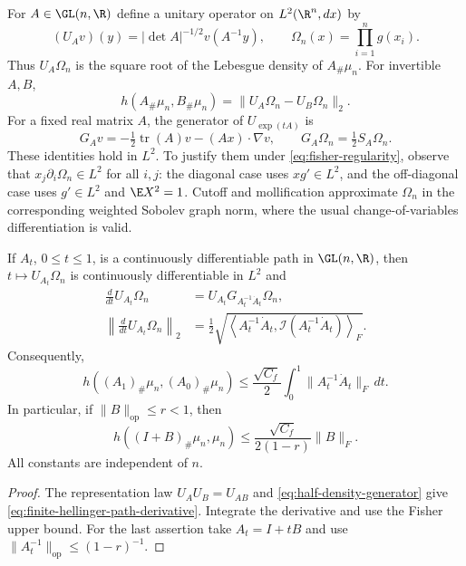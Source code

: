 For $A\in\GL(n,\R)$ define a unitary operator on
$L^2(\R^n,dx)$ by
\[
 (U_Av)(y)=|\det A|^{-1/2}v(A^{-1}y),
 \qquad
 \Omega_n(x)=\prod_{i=1}^n g(x_i).
\]
Thus $U_A\Omega_n$ is the square root of the Lebesgue density of
$A_\#\mu_n$.  For invertible $A,B$,
\[
 h(A_\#\mu_n,B_\#\mu_n)=\|U_A\Omega_n-U_B\Omega_n\|_2.
\]
For a fixed real matrix $A$, the generator of $U_{\exp(tA)}$ is
\begin{equation}
 G_Av=-\tfrac12\operatorname{tr}(A)v-(Ax)\cdot\nabla v,
 \qquad G_A\Omega_n=\tfrac12S_A\Omega_n.
 \label{eq:half-density-generator}
\end{equation}
These identities hold in $L^2$.
To justify them under \eqref{eq:fisher-regularity}, observe that
$x_j\partial_i\Omega_n\in L^2$ for all $i,j$: the diagonal case
uses $xg'\in L^2$, and the off-diagonal case uses $g'\in L^2$
and $\E X^2=1$.  Cutoff and mollification approximate
$\Omega_n$ in the corresponding weighted Sobolev graph norm, where
the usual change-of-variables differentiation is valid.

\begin{lemma}
\label{lem:finite-hellinger-upper}
If $A_t$, $0\le t\le1$, is a continuously differentiable path in
$\GL(n,\R)$, then $t\mapsto U_{A_t}\Omega_n$ is continuously
differentiable in $L^2$ and
\begin{equation}
 \begin{aligned}
 \frac d{dt}U_{A_t}\Omega_n
 &=U_{A_t}G_{A_t^{-1}\dot A_t}\Omega_n,\\
 \left\|\frac d{dt}U_{A_t}\Omega_n\right\|_2
 &=\frac12\sqrt{\left\langle A_t^{-1}\dot A_t,
                  \mathcal I(A_t^{-1}\dot A_t)\right\rangle_F}.
 \end{aligned}
 \label{eq:finite-hellinger-path-derivative}
\end{equation}
Consequently,
\begin{equation}
 h((A_1)_\#\mu_n,(A_0)_\#\mu_n)
 \le\frac{\sqrt{C_f}}2
       \int_0^1\|A_t^{-1}\dot A_t\|_F\,dt.
 \label{eq:finite-hellinger-path}
\end{equation}
In particular, if $\|B\|_{\mathrm{op}}\le r<1$, then
\begin{equation}
 h((I+B)_\#\mu_n,\mu_n)
 \le\frac{\sqrt{C_f}}{2(1-r)}\|B\|_F.
 \label{eq:finite-hellinger-upper}
\end{equation}
All constants are independent of $n$.
\end{lemma}

\begin{proof}
The representation law $U_AU_B=U_{AB}$ and
\eqref{eq:half-density-generator} give
\eqref{eq:finite-hellinger-path-derivative}.
Integrate the derivative and use the Fisher upper bound.  For the last
assertion take $A_t=I+tB$ and use
$\|A_t^{-1}\|_{\mathrm{op}}\le(1-r)^{-1}$.
\end{proof}

